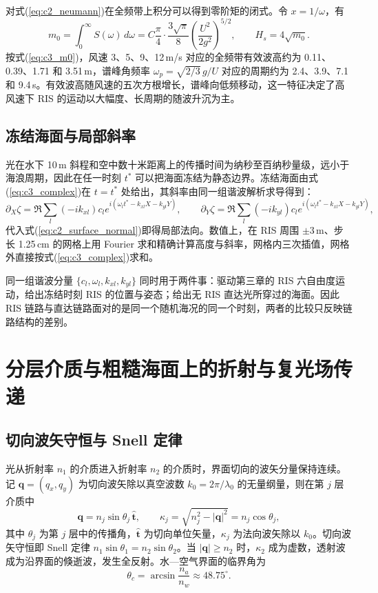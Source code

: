 对式(\ref{eq:c2_neumann})在全频带上积分可以得到零阶矩的闭式。令 $x=1/\omega$，有
\begin{equation}
m_0=\int_0^\infty S(\omega)\,d\omega=C\frac{\pi}{4}\cdot\frac{3\sqrt\pi}{8}\left(\frac{U^2}{2g^2}\right)^{5/2},\qquad H_s=4\sqrt{m_0}.
\label{eq:c3_m0}
\end{equation}
按式(\ref{eq:c3_m0})，风速 3、5、9、12\,m/s 对应的全频带有效波高约为 0.11、0.39、1.71 和 3.51\,m，谱峰角频率 $\omega_p=\sqrt{2/3}\,g/U$ 对应的周期约为 2.4、3.9、7.1 和 9.4\,s。有效波高随风速的五次方根增长，谱峰向低频移动，这一特征决定了高风速下 RIS 的运动以大幅度、长周期的随波升沉为主。

\subsection{冻结海面与局部斜率}

光在水下 10\,m 斜程和空中数十米距离上的传播时间为纳秒至百纳秒量级，远小于海浪周期，因此在任一时刻 $t^\ast$ 可以把海面冻结为静态边界。冻结海面由式(\ref{eq:c3_complex})在 $t=t^\ast$ 处给出，其斜率由同一组谐波解析求导得到：
\begin{equation}
\partial_X\zeta=\Re\sum_l(-ik_{xl})c_le^{i(\omega_lt^\ast-k_{xl}X-k_{yl}Y)},\qquad
\partial_Y\zeta=\Re\sum_l(-ik_{yl})c_le^{i(\omega_lt^\ast-k_{xl}X-k_{yl}Y)},
\label{eq:c2_slope}
\end{equation}
代入式(\ref{eq:c2_surface_normal})即得局部法向。数值上，在 RIS 周围 $\pm3\,\mathrm m$、步长 1.25\,cm 的网格上用 Fourier 求和精确计算高度与斜率，网格内三次插值，网格外直接按式(\ref{eq:c3_complex})求和。

同一组谐波分量 $\{c_l,\omega_l,k_{xl},k_{yl}\}$ 同时用于两件事：驱动第三章的 RIS 六自由度运动，给出冻结时刻 RIS 的位置与姿态；给出无 RIS 直达光所穿过的海面。因此 RIS 链路与直达链路面对的是同一个随机海况的同一个时刻，两者的比较只反映链路结构的差别。

\section{分层介质与粗糙海面上的折射与复光场传递}
\label{sec:c2_refraction}

\subsection{切向波矢守恒与 Snell 定律}

光从折射率 $n_1$ 的介质进入折射率 $n_2$ 的介质时，界面切向的波矢分量保持连续。记 $\mathbf q=(q_x,q_y)$ 为切向波矢除以真空波数 $k_0=2\pi/\lambda_0$ 的无量纲量，则在第 $j$ 层介质中
\begin{equation}
\mathbf q=n_j\sin\theta_j\,\hat{\mathbf t},\qquad
\kappa_j=\sqrt{n_j^2-|\mathbf q|^2}=n_j\cos\theta_j,
\label{eq:c2_q}
\end{equation}
其中 $\theta_j$ 为第 $j$ 层中的传播角，$\hat{\mathbf t}$ 为切向单位矢量，$\kappa_j$ 为法向波矢除以 $k_0$。切向波矢守恒即 Snell 定律 $n_1\sin\theta_1=n_2\sin\theta_2$。当 $|\mathbf q|\ge n_2$ 时，$\kappa_2$ 成为虚数，透射波成为沿界面的倏逝波，发生全反射。水—空气界面的临界角为
\begin{equation}
\theta_c=\arcsin\frac{n_a}{n_w}\approx48.75^\circ.
\label{eq:c2_critical}
\end{equation}

